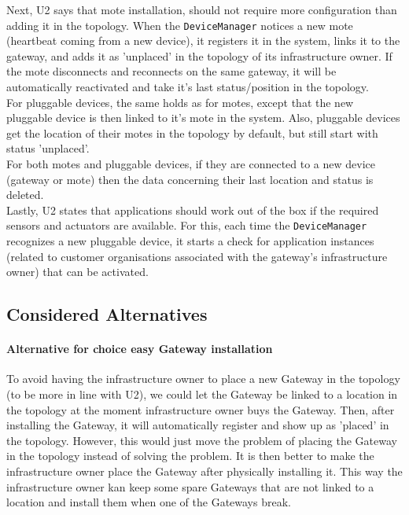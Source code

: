         Next, U2 says that mote installation, should not require more configuration than
        adding it in the topology. When the \texttt{DeviceManager} notices a new mote
        (heartbeat coming from a new device),
        it registers it in the system, links it to the gateway, and adds it as 'unplaced' in the topology of
        its infrastructure owner. If the mote disconnects and reconnects on the same
        gateway, it will be automatically reactivated and take it's last status/position in the topology.\\

        For pluggable devices, the same holds as for motes, except that the new pluggable device is then
        linked to it's mote in the system. Also, pluggable devices get the location of their
        motes in the topology by default, but still start with status 'unplaced'.\\

        For both motes and pluggable devices, if they are connected to a new device (gateway or mote)
        then the data concerning their last location and status is deleted.\\

        Lastly, U2 states that applications should work out of the box if the required sensors and
        actuators are available. For this, each time the \texttt{DeviceManager} recognizes a new
        pluggable device, it starts a check for application instances
        (related to customer organisations associated with the gateway's infrastructure owner)
        that can be activated.

    \subsection*{Considered Alternatives}
        \paragraph{Alternative for choice easy Gateway installation}
            To avoid having the infrastructure owner to place a new Gateway in the topology (to be more in line with U2),
            we could let the Gateway be linked to a location in the topology at the moment infrastructure owner buys the
            Gateway. Then, after installing the Gateway, it will automatically register and show up as 'placed' in the topology.
            However, this would just move the problem of placing the Gateway in the topology instead of solving the problem.
            It is then better to make the infrastructure owner place the Gateway after physically installing it. This way
            the infrastructure owner kan keep some spare Gateways that are not linked to a location and install them when
            one of the Gateways break.
